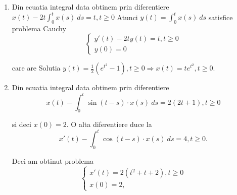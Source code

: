\documentclass[a4paper,12pt,oneside]{report}
\begin{document}
\begin{enumerate}
		      	\begin{enumerate}[label=(\alph*)]
		      		\item Din ecuatia integral data obtinem prin diferentiere 
		      		      \(x\left ( t \right ) -2t \int_{0}^{t}x\left ( s \right )\ ds = t, t\geq 0\)
		      		      Atunci \(y\left ( t \right ) = \int_{0}^{t}x\left ( s \right )  \ ds\) satisfice problema Cauchy 
		      		      \begin{displaymath}
		      		      	\left\{\begin{matrix}
		      		      	{y}'\left ( t \right ) - 2ty\left ( t \right ) = t, t\geq 0\\ 
		      		      	y\left ( 0 \right ) = 0
		      		      	\end{matrix}\right.
		      		      \end{displaymath}
		      		      		      		      		      		      		      		      		      		      
		      		      care are Solutia 
		      		      \(y\left ( t \right ) = \frac{1}{2}\left ( e^{t^{2}}- 1 \right ), t\geq 0\Rightarrow x\left ( t \right ) = te^{t^{2}}, t\geq 0\).
		      		      		      		      		      		      		      		      		      		      
		      		\item Din ecuatia integral data obtinem prin diferentiere 
		      		      \begin{displaymath}
		      		      	x\left ( t \right ) - \int_{0}^{t}\sin \left ( t-s \right )\cdot x\left ( s \right ) \ ds = 2\left ( 2t + 1 \right ), t\geq 0 
		      		      \end{displaymath}
		      		      		      		      		      		      		      		      		      		      
		      		      si deci \(x\left ( 0 \right ) = 2\). O alta diferentiere duce la 
		      		      \begin{displaymath}
		      		      	{x}'\left ( t  \right ) - \int_{0}^{t}\cos \left ( t-s \right ) \cdot  x\left ( s \right ) \ ds = 4, t\geq 0.
		      		      \end{displaymath}
		      		      		      		      		      		      		      		      		      		      
		      		      Deci am obtinut problema 
		      		      \begin{displaymath}
		      		      	\left\{\begin{matrix}
		      		      	{x}'\left ( t \right ) = 2\left ( t^{2} + t + 2 \right ), t\geq 0\\ 
		      		      	x\left ( 0 \right ) = 2,
		      		      	\end{matrix}\right.
		      		      \end{displaymath}
		      		      		      		      		      		      		      		      		      		      

\end{enumerate}
\end{enumerate}
\end{document}
